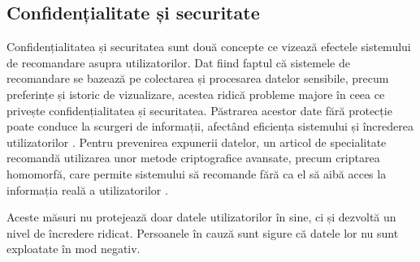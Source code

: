 \subsection{Confidențialitate și securitate}
\label{subsec:ch3sec4sub3}
Confidențialitatea și securitatea sunt două concepte ce vizează efectele sistemului de recomandare asupra utilizatorilor.
Dat fiind faptul că sistemele de recomandare se bazează pe colectarea și procesarea datelor sensibile, precum preferințe și istoric de vizualizare, acestea ridică probleme majore în ceea ce privește confidențialitatea și securitatea.
Păstrarea acestor date fără protecție poate conduce la scurgeri de informații, afectând eficiența sistemului și încrederea utilizatorilor \cite{huang2019privacy}.
Pentru prevenirea expunerii datelor, un articol de specialitate recomandă utilizarea unor metode criptografice avansate, precum criptarea homomorfă, care permite sistemului să recomande fără ca el să aibă acces la informația reală a utilizatorilor \cite{badsha2016practical}.
\par
Aceste măsuri nu protejează doar datele utilizatorilor în sine, ci și dezvoltă un nivel de încredere ridicat. 
Persoanele în cauză sunt sigure că datele lor nu sunt exploatate în mod negativ.